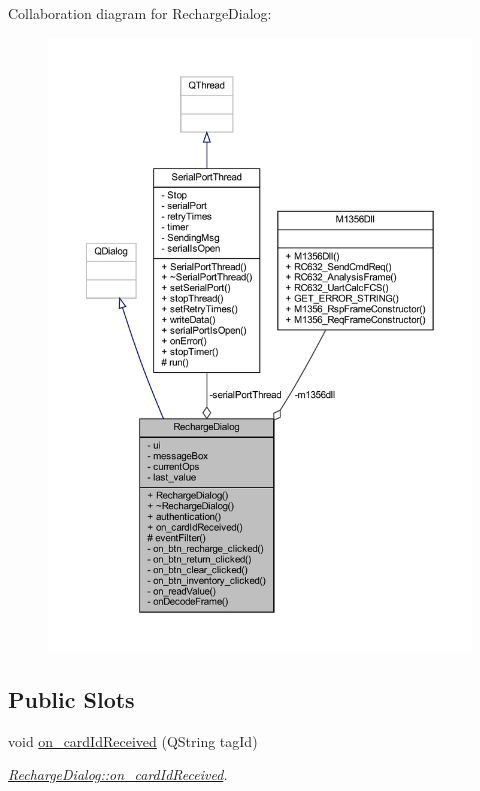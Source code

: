 Collaboration diagram for Recharge\+Dialog\+:
\nopagebreak
\begin{figure}[H]
\begin{center}
\leavevmode
\includegraphics[width=350pt]{class_recharge_dialog__coll__graph}
\end{center}
\end{figure}
\subsection*{Public Slots}
\begin{DoxyCompactItemize}
\item 
void \mbox{\hyperlink{class_recharge_dialog_adf95e380b531e5817063abac78cdd607}{on\+\_\+card\+Id\+Received}} (Q\+String tag\+Id)
\begin{DoxyCompactList}\small\item\em \mbox{\hyperlink{class_recharge_dialog_adf95e380b531e5817063abac78cdd607}{Recharge\+Dialog\+::on\+\_\+card\+Id\+Received}}. \end{DoxyCompactList}\end{DoxyCompactItemize}
